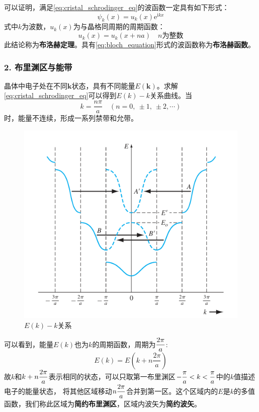 可以证明，满足\autoref{eq:cristal_schrodinger_eq}的波函数一定具有如下形式：
\begin{equation}
    \psi_k(x)=u_k(x)\mathrm{e}^{\mathrm{i}kx}\label{eq:bloch_equation}
\end{equation}
式中$k$为波数，$u_k(x)$为与晶格同周期的周期函数：
\begin{equation}
    u_k(x)=u_k(x+na)\quad \text{$n$为整数}
\end{equation}
此结论称为\textbf{布洛赫定理}。具有\autoref{eq:bloch_equation}形式的波函数称为\textbf{布洛赫函数}。

\subsubsection{2. 布里渊区与能带}

晶体中电子处在不同$\bm k$状态，具有不同能量$E(\bm k)$。求解\autoref{eq:cristal_schrodinger_eq}可以得到$E(k)-k$关系曲线。当
\begin{equation}
    k=\frac{n\pi}{a}\quad (n=0,\ \pm 1,\ \pm 2,\cdots)
\end{equation}
时，能量不连续，形成一系列禁带和允带。
\begin{figure}[H]
    \centering
    \includegraphics{energy_band.png}
    \caption{$E(k)-k$关系}
    \label{fig:energy_band}
\end{figure}

\vspace{1ex}可以看到，能量$E(k)$也为$k$的周期函数，周期为$\displaystyle\frac{2\pi}{a}$:
\begin{equation}
    E(k)=E\left(k+n\frac{2\pi}{a}\right)
\end{equation}
\vspace{1ex}故$k$和$k+\displaystyle n\frac{2\pi}{a}$表示相同的状态，可以只取第一布里渊区$\displaystyle -\frac{\pi}{a}<k<\frac{\pi}{a}$中的$k$值描述电子的能量状态，
\vspace{1ex}将其他区域移动$\displaystyle n\frac{2\pi}{a}$合并到第一区。这个区域内的$E$是$k$的多值函数，我们称此区域为\textbf{简约布里渊区}，区域内波矢为\textbf{简约波矢}。

